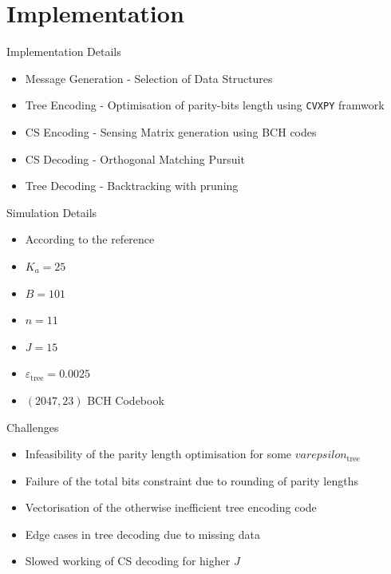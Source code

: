 \documentclass[aspectratio=169, handout, 10pt, hyperref=colorlinks]{beamer}
\begin{document}
\section{Implementation}
\begin{frame}{Implementation Details}
    \begin{itemize}
        \item Message Generation - Selection of Data Structures
        \item Tree Encoding - Optimisation of parity-bits length using \texttt{CVXPY} framwork
        \item CS Encoding - Sensing Matrix generation using BCH codes
        \item CS Decoding - Orthogonal Matching Pursuit
        \item Tree Decoding - Backtracking with pruning
    \end{itemize}
\end{frame}
\begin{frame}{Simulation Details}
    \begin{itemize}
        \item According to the reference
        \item $K_a=25$
        \item $B = 101$
        \item $n = 11$
        \item $J = 15$
        \item $\varepsilon_\text{tree}=0.0025$
        \item $(2047,23)$ BCH Codebook
    \end{itemize}
\end{frame}

\begin{frame}{Challenges}
\begin{itemize}
    \item Infeasibility of the parity length optimisation for some $varepsilon_\text{tree}$
    \item Failure of the total bits constraint due to rounding of parity lengths
    \item Vectorisation of the otherwise inefficient tree encoding code
    \item Edge cases in tree decoding due to missing data
    \item Slowed working of CS decoding for higher $J$
    
\end{itemize}
\end{frame}
\end{document}
